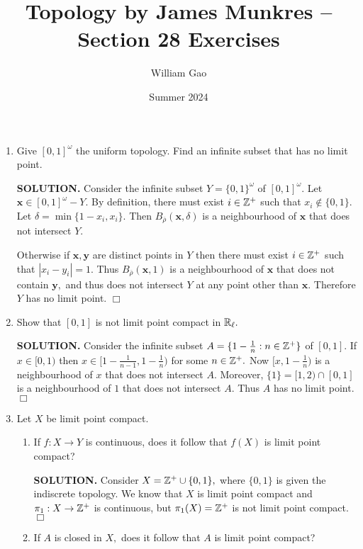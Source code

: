 \documentclass{article}
\title{Topology by James Munkres -- Section 28 Exercises}
\author{William Gao}
\date{Summer 2024}
\begin{document}
\maketitle

\begin{enumerate}
    \item Give $[0, 1]^\omega$ the uniform topology. Find an infinite subset that has no limit point.

    {\bf SOLUTION.} Consider the infinite subset $Y = \{0, 1\}^\omega$ of $[0,1]^\omega.$ Let $\mathbf{x} \in [0, 1]^\omega - Y.$ By definition, there must exist $i \in \mathbb{Z}^+$ such that $x_i \notin \{0, 1\}.$ Let $\delta = \min\{1-x_i, x_i\}.$ Then $B_{\overline{\rho}}(\mathbf{x}, \delta)$ is a neighbourhood of $\mathbf{x}$ that does not intersect $Y.$

    Otherwise if $\mathbf{x}, \mathbf{y}$ are distinct points in $Y$ then there must exist $i \in \mathbb{Z}^+$ such that $|x_i-y_i| = 1.$ Thus $B_{\overline{\rho}}(\mathbf{x}, 1)$ is a neighbourhood of $\mathbf{x}$ that does not contain $\mathbf{y},$ and thus does not intersect $Y$ at any point other than $\mathbf{x}.$ Therefore $Y$ has no limit point. $\Box$

    \item Show that $[0, 1]$ is not limit point compact in $\mathbb{R}_\ell.$

    {\bf SOLUTION.} Consider the infinite subset $A = \{1 - \frac1n: n \in \mathbb{Z}^+\}$ of $[0, 1]$. If $x \in [0, 1)$ then $x \in [1-\frac1{n-1}, 1-\frac1n)$ for some $n \in \mathbb{Z}^+.$ Now $[x, 1-\frac1n)$ is a neighbourhood of $x$ that does not intersect $A.$ Moreover, $\{1\} = [1, 2) \cap [0, 1]$ is a neighbourhood of $1$ that does not intersect $A.$ Thus $A$ has no limit point. $\Box$

    \item Let $X$ be limit point compact.
    \begin{enumerate}
        \item If $f: X \rightarrow Y$ is continuous, does it follow that $f(X)$ is limit point compact?

        {\bf SOLUTION.} Consider $X = \mathbb{Z}^+ \cup \{0, 1\},$ where $\{0, 1\}$ is given the indiscrete topology. We know that $X$ is limit point compact and $\pi_1: X \rightarrow \mathbb{Z}^+$ is continuous, but $\pi_1(X) = \mathbb{Z}^+$ is not limit point compact. $\Box$

        \item If $A$ is closed in $X,$ does it follow that $A$ is limit point compact?


\end{enumerate}
\end{enumerate}
\end{document}

